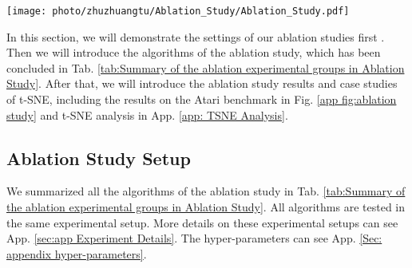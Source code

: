 \renewcommand{\thesubfigure}{(\alph{subfigure})}
\setcounter{subfigure}{0}



\begin{figure*}[!t]
	\centering
\texttt{[image: photo/zhuzhuangtu/Ablation\_Study/Ablation\_Study.pdf]}
	\centering
\caption{Ablation Results on Atari Benchmark \citep{ale2}. All the results are scaled by  that of our main algorithm to improve readability. In these figures, we sequentially demonstrate how much performance (\%) will degrade after ablating each component of LBC.}
\label{app fig:ablation study}
\end{figure*}

In this section, we will demonstrate the settings of our ablation studies first . Then we will introduce the algorithms of the ablation study, which has been concluded  in Tab. \ref{tab:Summary of the ablation experimental groups in Ablation Study}. After that, we will introduce the ablation study results and case studies of t-SNE, including the results on the Atari benchmark in Fig. \ref{app fig:ablation study} and t-SNE analysis in App. \ref{app: TSNE Analysis}.

\subsection{Ablation Study Setup}
\label{app: Ablation Study Setup}

 We  summarized all the algorithms of the ablation study in Tab. \ref{tab:Summary of the ablation experimental groups in Ablation Study}.  All algorithms are tested in the same experimental setup. More details on these experimental setups can see App. \ref{sec:app Experiment Details}.  The hyper-parameters can see App. \ref{Sec: appendix hyper-parameters}. 
 

